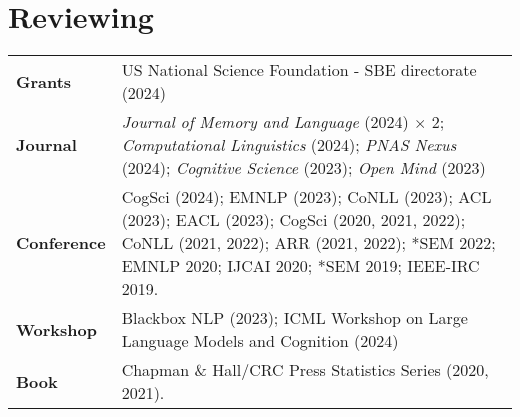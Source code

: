\documentclass[11pt]{article}
\begin{document}
\section*{Reviewing}
\vspace{-1em}
\begin{longtable}{p{}  p{} }
    \textbf{Grants} & US National Science Foundation - SBE directorate (2024)\\
    \textbf{Journal} & \textit{Journal of Memory and Language} (2024) $\times$ 2; \textit{Computational Linguistics} (2024); \textit{PNAS Nexus} (2024); \textit{Cognitive Science} (2023); \textit{Open Mind} (2023)\\
    \textbf{Conference} & CogSci (2024); EMNLP (2023); CoNLL (2023); ACL (2023); EACL (2023); CogSci (2020, 2021, 2022); CoNLL (2021, 2022); ARR (2021, 2022); *SEM 2022; EMNLP 2020; IJCAI 2020; *SEM 2019; IEEE-IRC 2019.\\
    \textbf{Workshop} & Blackbox NLP (2023); ICML Workshop on Large Language Models and Cognition (2024)\\
    \textbf{Book} & Chapman \& Hall/CRC Press Statistics Series (2020, 2021).
\end{longtable}
\end{document}
